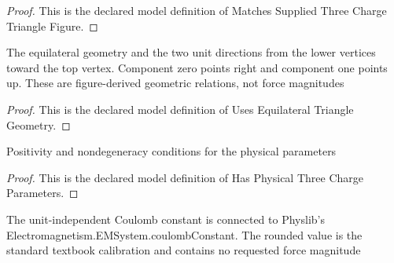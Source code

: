 \begin{proof}
  This is the declared model definition of Matches Supplied Three Charge Triangle Figure.
\end{proof}
\begin{definition}
  \label{def:physics:phyx-mini-0893:phyxminiproblems-problemphyxmini0893-usesequilateraltrianglegeometry}
  The equilateral geometry and the two unit directions from the lower vertices toward the top vertex. Component zero points right and component one points up. These are figure-derived geometric relations, not force magnitudes
\end{definition}
\begin{proof}
  This is the declared model definition of Uses Equilateral Triangle Geometry.
\end{proof}
\begin{definition}
  \label{def:physics:phyx-mini-0893:phyxminiproblems-problemphyxmini0893-hasphysicalthreechargeparameters}
  Positivity and nondegeneracy conditions for the physical parameters
\end{definition}
\begin{proof}
  This is the declared model definition of Has Physical Three Charge Parameters.
\end{proof}
\begin{definition}
  \label{def:physics:phyx-mini-0893:phyxminiproblems-problemphyxmini0893-usestextbookvacuumcoulombconstant}
  The unit-independent Coulomb constant is connected to Physlib's Electromagnetism.EMSystem.coulombConstant. The rounded value is the standard textbook calibration and contains no requested force magnitude
\end{definition}
